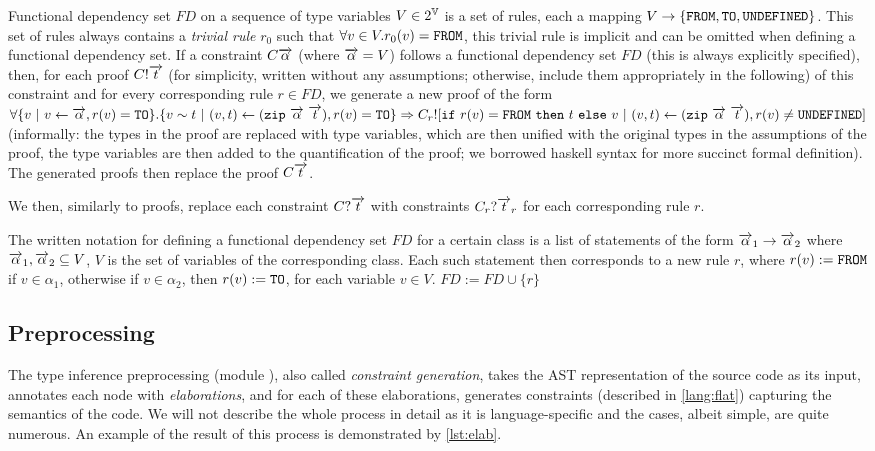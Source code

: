 \begin{description}
    Functional dependency set $FD$ on a sequence of type variables $V \in 2^{\mathbb{V}}$ is a set of rules, each a mapping $V \to \{\mathtt{FROM}, \mathtt{TO}, \mathtt{UNDEFINED}\}$. This set of rules always contains a \emph{trivial rule} $r_0$ such that $\forall v \in V . r_0(v) = \mathtt{FROM}$, this trivial rule is implicit and can be omitted when defining a functional dependency set. If a constraint $C \overrightarrow{\alpha}$ (where $\overrightarrow{\alpha} = V$) follows a functional dependency set $FD$ (this is always explicitly specified), then, for each proof $C! \overrightarrow{t}$ (for simplicity, written without any assumptions; otherwise, include them appropriately in the following) of this constraint and for every corresponding rule $r \in FD$, we generate a new proof of the form $\forall \{v \ |\  v \gets \overrightarrow{\alpha}, r(v) = \mathtt{TO}\} . \{v \sim t \ |\  (v, t) \gets (\mathtt{zip}\ \overrightarrow{\alpha}\ \overrightarrow{t}), r(v) = \mathtt{TO} \} \Rightarrow C_r! [\mathtt{if}\ r(v) = \mathtt{FROM}\ \mathtt{then}\ t\ \mathtt{else}\ v \ |\  (v, t) \gets (\mathtt{zip}\ \overrightarrow{\alpha}\ \overrightarrow{t}), r(v) \neq \mathtt{UNDEFINED}]$ (informally: the  types in the proof are replaced with type variables, which are then unified with the original types in the assumptions of the proof, the type variables are then added to the quantification of the proof; we borrowed haskell syntax for more succinct formal definition). The generated proofs then replace the proof $C \overrightarrow{t}$.

    We then, similarly to proofs, replace each constraint $C? \overrightarrow{t}$ with constraints $C_r? \overrightarrow{t}_r$ for each corresponding rule $r$.

    The written notation for defining a functional dependency set $FD$ for a certain class is a list of statements of the form $\overrightarrow{\alpha}_1 \to \overrightarrow{\alpha}_2$ where $\overrightarrow{\alpha}_1, \overrightarrow{\alpha}_2 \subseteq V$, $V$ is the set of variables of the corresponding class. Each such statement then corresponds to a new rule $r$, where $r(v) := \mathtt{FROM}$ if $v \in \alpha_1$, otherwise if $v \in \alpha_2$, then $r(v) := \mathtt{TO}$, for each variable $v \in V$. $FD := FD \cup \{r\}$

\end{description}

\subsection{Preprocessing}
\label{preprocessing}

The type inference preprocessing (module ), also called \emph{constraint generation}, takes the AST representation of the source code as its input, annotates each node with \emph{elaborations}, and for each of these elaborations, generates constraints (described in \cref{lang:flat}) capturing the semantics of the code. We will not describe the whole process in detail as it is language-specific and the cases, albeit simple, are quite numerous. An example of the result of this process is demonstrated by \cref{lst:elab}.

